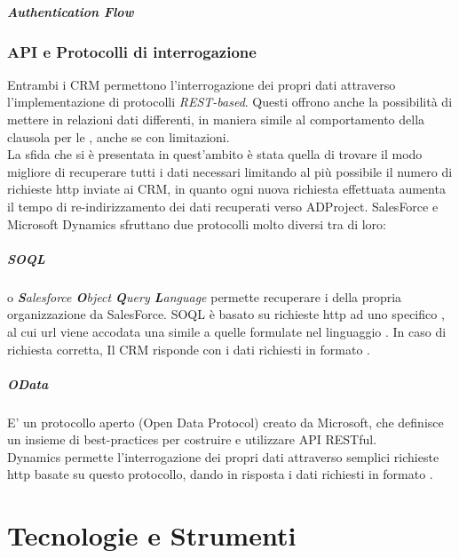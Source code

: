 \documentclass[12pt,a4paper,twoside,openright,english]{book}
\begin{document}
			\paragraph{Authentication Flow}
		\subsection{API e Protocolli di interrogazione}
			Entrambi i CRM permettono l'interrogazione dei propri dati attraverso l'implementazione di protocolli \textit{REST-based}. Questi offrono anche la possibilità di mettere in relazioni dati differenti, in maniera simile al comportamento della clausola  per le  , anche se con limitazioni.\\ 
			La sfida che si è presentata in quest'ambito è stata quella di trovare il modo migliore di recuperare tutti i dati necessari limitando al più possibile il numero di richieste http inviate ai CRM, in quanto ogni nuova richiesta effettuata aumenta il tempo di re-indirizzamento dei dati recuperati verso ADProject.
			SalesForce e Microsoft Dynamics sfruttano due protocolli molto diversi tra di loro:
			\paragraph{SOQL}
			o \textit{\textbf{S}alesforce \textbf{O}bject \textbf{Q}uery \textbf{L}anguage} permette recuperare i della propria organizzazione da SalesForce. SOQL è basato su richieste http ad uno specifico , al cui url viene accodata una  simile a quelle formulate nel linguaggio . In caso di richiesta corretta, Il CRM risponde con i dati richiesti in formato .
			\paragraph{OData}
			E' un protocollo aperto (Open Data Protocol) creato da Microsoft, che definisce un insieme di best-practices per costruire e utilizzare API RESTful.\\
			Dynamics permette l'interrogazione dei propri dati attraverso semplici richieste http basate su questo protocollo, dando in risposta i dati richiesti in formato .
			
			
\chapter{Tecnologie e Strumenti}\label{tecnologie}
\end{document}
